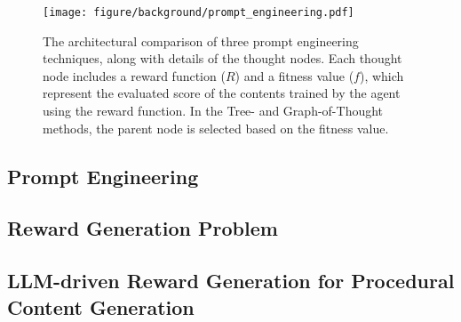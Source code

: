 
\begin{figure*}[!t]
    \centering
    \texttt{[image: figure/background/prompt\_engineering.pdf]}
    \caption{The architectural comparison of three prompt engineering techniques, along with details of the thought nodes. Each thought node includes a reward function ($R$) and a fitness value ($f$), which represent the evaluated score of the contents trained by the agent using the reward function. In the Tree- and Graph-of-Thought methods, the parent node is selected based on the fitness value.}
    \label{fig:reasoning_pe}
\end{figure*}


\subsection{Prompt Engineering}


\subsection{Reward Generation Problem}


\subsection{LLM-driven Reward Generation for Procedural Content Generation}

